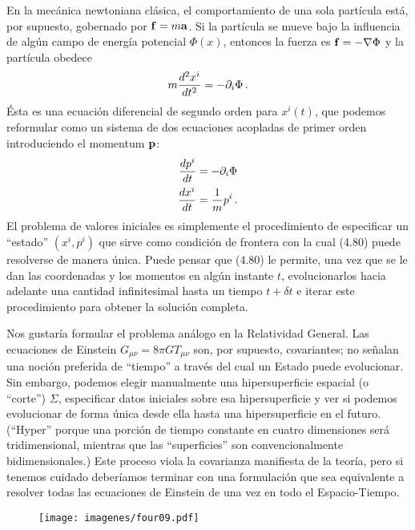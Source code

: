 \documentclass[11pt,b5paper,openany,twoside]{book}
\newcommand{\mn}{{\mu\nu}}
\newcommand{\p}[1]{{\partial_{#1}}}
\begin{document}
En la mecánica newtoniana clásica, el comportamiento de una sola partícula está, por supuesto, gobernado por ${\bf f} = m{\bf a}$.
Si la partícula se mueve bajo la influencia de algún campo de energía potencial $\Phi(x)$, entonces la fuerza es ${\bf f} = -\nabla \Phi$ y la partícula obedece
\begin{equation}
m{{d^2x^i}\over{dt^2}}=-\p{i}\Phi\,.\label{4.79}
\end{equation}
Ésta es una ecuación diferencial de segundo orden para $x^i(t)$, que podemos reformular como un sistema de dos ecuaciones acopladas de primer orden introduciendo el momentum ${\bf p}$:
\begin{align}
{{dp^i}\over{dt}} &=  -\p{i}\Phi \notag \\
{{dx^i}\over{dt}}  &=  {1\over m}p^i\,. \label{4.80}
\end{align}
El problema de valores iniciales es simplemente el procedimiento de especificar un ``estado'' $(x^i,p^i)$ que sirve como condición de frontera con la cual (4.80) puede resolverse de manera única.
Puede pensar que (4.80) le permite, una vez que se le dan las coordenadas y los momentos en algún instante $t$, evolucionarlos hacia adelante una cantidad infinitesimal hasta un tiempo $t+\delta t$ e iterar este procedimiento para obtener la solución completa.

Nos gustaría formular el problema análogo en la Relatividad General.
Las ecuaciones de Einstein $G_\mn = 8\pi G T_\mn$ son, por supuesto, covariantes; no señalan una noción preferida de ``tiempo'' a través del cual un Estado puede evolucionar.
Sin embargo, podemos elegir manualmente una hipersuperficie espacial (o ``corte'') $\Sigma$, especificar datos iniciales sobre esa hipersuperficie y ver si podemos evolucionar de forma única desde ella hasta una hipersuperficie en el futuro.
(``Hyper'' porque una porción de tiempo constante en cuatro dimensiones será tridimensional, mientras que las ``superficies'' son convencionalmente bidimensionales.)
Este proceso viola la covarianza manifiesta de la teoría, pero si tenemos cuidado deberíamos terminar con una formulación que sea equivalente a resolver todas las ecuaciones de Einstein de una vez en todo el Espacio-Tiempo.

\begin{figure}[h]
\centering
\texttt{[image: imagenes/four09.pdf]}
\end{figure}
\end{document}
